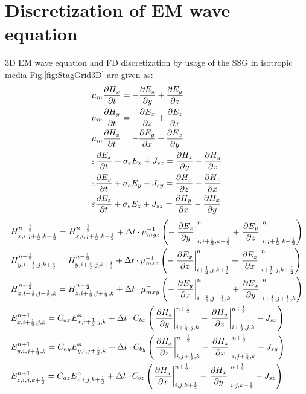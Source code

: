 \documentclass[pdftex,a4paper,parskip,listof=totoc,bibliography=totoc,onehalfspacing,12pt]{scrreprt}
\begin{document}
\section{Discretization of EM wave equation}
3D EM wave equation and FD discretization by usage of the SSG in isotropic media Fig.\ref{fig:StagGrid3D} are given as:
\begin{equation}
\begin{aligned}
  &\mu_{m} \pdv{H_{x}}{t} = -\pdv{E_z}{y} + \pdv{E_y}{z}\\
  &\mu_{m} \pdv{H_{y}}{t} = -\pdv{E_x}{z} + \pdv{E_z}{x}\\
  &\mu_{m} \pdv{H_{z}}{t} = -\pdv{E_y}{x} + \pdv{E_x}{y}\\
  &\varepsilon \pdv{E_{x}}{t} + \sigma_{e} E_{x} + J_{sx} = \pdv{H_z}{y} - \pdv{H_y}{z}\\
  &\varepsilon \pdv{E_{y}}{t} + \sigma_{e} E_{y} + J_{sy} = \pdv{H_x}{z} - \pdv{H_z}{x}\\
  &\varepsilon \pdv{E_{z}}{t} + \sigma_{e} E_{z} + J_{sz} = \pdv{H_y}{x} - \pdv{H_x}{y}
\end{aligned}
\end{equation}
\begin{equation}
\begin{aligned}
  &H_{x,i,j+\frac{1}{2},k+\frac{1}{2}}^{n+\frac{1}{2}} = H_{x,i,j+\frac{1}{2},k+\frac{1}{2}}^{n-\frac{1}{2}} + \Delta t \cdot \mu_{myz}^{-1}  \left(- \left.\pdv{ E_{z}}{y}\right\rvert_{i,j+\frac{1}{2},k+\frac{1}{2}}^{n} + \left.\pdv{ E_{y}}{z}\right\rvert_{i,j+\frac{1}{2},k+\frac{1}{2}}^{n} \right)\\
  &H_{y,i+\frac{1}{2},j,k+\frac{1}{2}}^{n+\frac{1}{2}} = H_{y,i+\frac{1}{2},j,k+\frac{1}{2}}^{n-\frac{1}{2}} + \Delta t \cdot \mu_{mxz}^{-1}  \left(- \left.\pdv{ E_{x}}{z}\right\rvert_{i+\frac{1}{2},j,k+\frac{1}{2}}^{n} + \left.\pdv{ E_z}{x}\right\rvert_{i+\frac{1}{2},j,k+\frac{1}{2}}^{n} \right)\\
  &H_{z,i+\frac{1}{2},j+\frac{1}{2},k}^{n+\frac{1}{2}} = H_{z,i+\frac{1}{2},j+\frac{1}{2},k}^{n-\frac{1}{2}} + \Delta t \cdot \mu_{mxy}^{-1}  \left(- \left.\pdv{ E_y}{x}\right\rvert_{i+\frac{1}{2},j+\frac{1}{2},k}^{n} + \left.\pdv{ E_x}{y}\right\rvert_{i+\frac{1}{2},j+\frac{1}{2},k}^{n} \right)\\
  &E_{x,i+\frac{1}{2},j,k}^{n+1} = C_{ax} E_{x,i+\frac{1}{2},j,k}^{n} + \Delta t \cdot C_{bx} \left( \left.\pdv{ H_z}{y}\right\rvert_{i+\frac{1}{2},j,k}^{n+\frac{1}{2}} - \left.\pdv{ H_y}{z}\right\rvert_{i+\frac{1}{2},j,k}^{n+\frac{1}{2}} - J_{sx} \right)\\
  &E_{y,i,j+\frac{1}{2},k}^{n+1} = C_{ay} E_{y,i,j+\frac{1}{2},k}^{n} + \Delta t \cdot C_{by} \left( \left.\pdv{ H_x}{z}\right\rvert_{i,j+\frac{1}{2},k}^{n+\frac{1}{2}} - \left.\pdv{ H_z}{x}\right\rvert_{i,j+\frac{1}{2},k}^{n+\frac{1}{2}} - J_{sy} \right)\\
  &E_{z,i,j,k+\frac{1}{2}}^{n+1} = C_{az} E_{z,i,j,k+\frac{1}{2}}^{n} + \Delta t \cdot C_{bz} \left( \left.\pdv{ H_y}{x}\right\rvert_{i,j,k+\frac{1}{2}}^{n+\frac{1}{2}} - \left.\pdv{ H_x}{y}\right\rvert_{i,j,k+\frac{1}{2}}^{n+\frac{1}{2}} - J_{sz} \right)
\end{aligned}
\end{equation}
\end{document}
